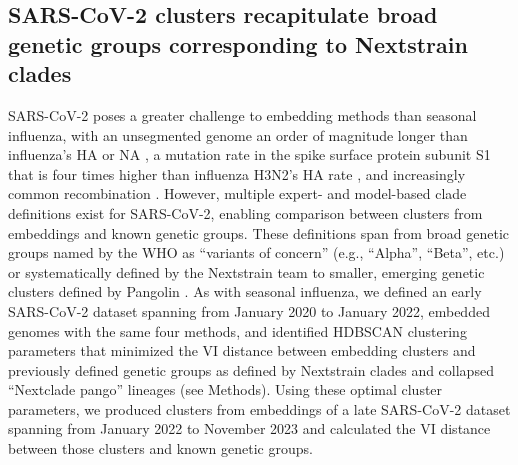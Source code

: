 \documentclass[10pt,letterpaper]{article}
\begin{document}
\subsection*{SARS-CoV-2 clusters recapitulate broad genetic groups corresponding to Nextstrain clades}

SARS-CoV-2 poses a greater challenge to embedding methods than seasonal influenza, with an unsegmented genome an order of magnitude longer than influenza's HA or NA \cite{Zhu2020}, a mutation rate in the spike surface protein subunit S1 that is four times higher than influenza H3N2's HA rate \cite{Kistler2022}, and increasingly common recombination \cite{Focosi2022,Turakhia2022}.
However, multiple expert- and model-based clade definitions exist for SARS-CoV-2, enabling comparison between clusters from embeddings and known genetic groups.
These definitions span from broad genetic groups named by the WHO as ``variants of concern'' (e.g., ``Alpha'', ``Beta'', etc.) \cite{Konings2021} or systematically defined by the Nextstrain team \cite{Hodcroft2020,Bedford2021,Roemer2022} to smaller, emerging genetic clusters defined by Pangolin \cite{OToole2021}.
As with seasonal influenza, we defined an early SARS-CoV-2 dataset spanning from January 2020 to January 2022, embedded genomes with the same four methods, and identified HDBSCAN clustering parameters that minimized the VI distance between embedding clusters and previously defined genetic groups as defined by Nextstrain clades and collapsed ``Nextclade pango'' lineages (see Methods).
Using these optimal cluster parameters, we produced clusters from embeddings of a late SARS-CoV-2 dataset spanning from January 2022 to November 2023 and calculated the VI distance between those clusters and known genetic groups.
\end{document}
